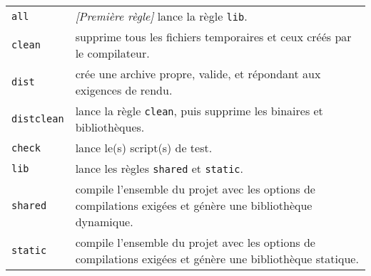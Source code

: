 \bigskip

\begin{tabular}{l p{13cm}}
\texttt{all} & \textit{[Première règle]} lance la règle \texttt{lib}.\\
\texttt{clean} & supprime tous les fichiers temporaires et ceux créés par le compilateur.\\
\texttt{dist} & crée une archive propre, valide, et répondant aux exigences de rendu.\\
\texttt{distclean} & lance la règle \texttt{clean}, puis supprime les binaires et bibliothèques.\\
\texttt{check} & lance le(s) script(s) de test.\\
\texttt{lib} & lance les règles \texttt{shared} et \texttt{static}.\\
\texttt{shared} & compile l'ensemble du projet avec les options de compilations exigées et génère une bibliothèque dynamique.\\
\texttt{static} & compile l'ensemble du projet avec les options de compilations exigées et génère une bibliothèque statique.\\
\end{tabular}

